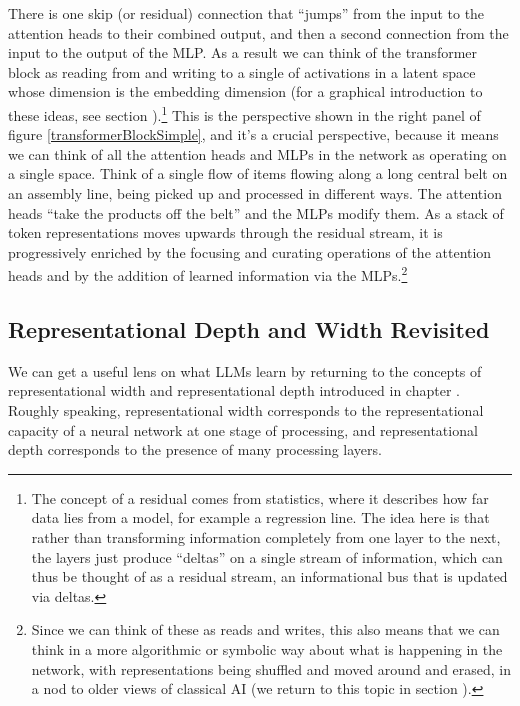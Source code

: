 There is one skip (or residual) connection that ``jumps'' from the input to the attention heads to their combined output, and then a second connection from the input to the output of the MLP. As a result we can think of the transformer block as reading
from and writing to a single  of activations in a
latent space \cite{elhage2021mathematical, milliere2024philosophical2} whose
dimension is the embedding dimension (for a graphical introduction to these ideas, see section
).\footnote{The concept of a residual comes from statistics, where it describes how far data lies from a model, for example a regression line. The idea
here is that rather than transforming information completely from one layer to
the next,  the layers just produce ``deltas'' on a single stream of
information, which can thus be thought of as a residual stream, an informational bus that is updated via deltas.} This is the
perspective shown in the right panel of figure \ref{transformerBlockSimple}, and it's
a crucial perspective, because it means we can think of all the attention heads and MLPs in the network as operating on a single space. Think of a single flow of items flowing along a long central belt on an assembly line, being picked up and processed in different ways. The attention heads ``take the products off the belt'' and the MLPs modify them. As a stack of token representations moves upwards through the
residual stream, it is progressively enriched by the focusing and curating operations of the attention heads and by the addition of learned information via the MLPs.\footnote{Since we can think of these as reads and writes, this
also means that we can think in a more algorithmic or symbolic way about what
is happening in the network, with representations being shuffled and moved
around and erased, in a nod to older views of classical AI (we return to
this topic in section ).}

\subsection{Representational Depth and Width Revisited}\label{depthWidthRevisited}

We can get a useful lens on what LLMs learn by returning to the concepts of
representational width and representational depth introduced in chapter .  Roughly speaking, representational width corresponds to the representational capacity of a neural network at one stage of processing, and representational depth corresponds to the presence of many processing layers.
 
